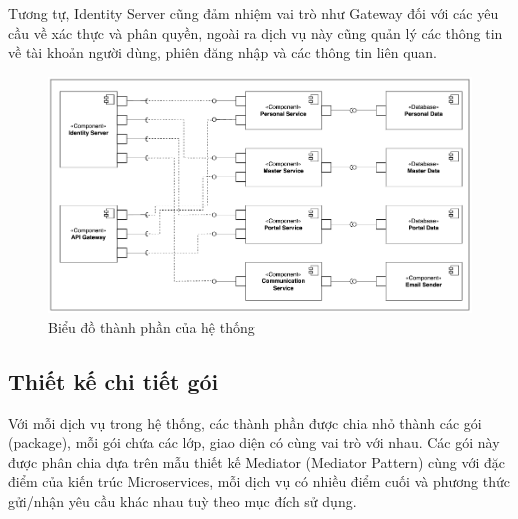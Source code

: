 \documentclass[../DoAn.tex]{subfiles}
\begin{document}
Tương tự, Identity Server cũng đảm nhiệm vai trò như Gateway đối với các yêu cầu về xác thực và phân quyền, ngoài ra dịch vụ này cũng quản lý các thông tin về tài khoản người dùng,
phiên đăng nhập và các thông tin liên quan.

\begin{figure}[H]
    \centering
    \includegraphics[width=1.0\linewidth]{Hinhve/General_ComponentDiagram.png}
    \caption{Biểu đồ thành phần của hệ thống}
    \label{fig:General_ComponentDiagram}
\end{figure}
\newpage


\subsection{Thiết kế chi tiết gói}
\label{subsection:4.1.3}

Với mỗi dịch vụ trong hệ thống, các thành phần được chia nhỏ thành các gói (package), mỗi gói chứa các lớp, giao diện có cùng vai trò với nhau.
Các gói này được phân chia dựa trên mẫu thiết kế Mediator (Mediator Pattern) cùng với đặc điểm của kiến trúc Microservices, mỗi dịch vụ có nhiều
điểm cuối và phương thức gửi/nhận yêu cầu khác nhau tuỳ theo mục đích sử dụng.
\end{document}
